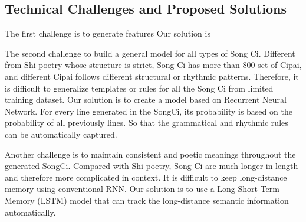 \subsection{Technical Challenges and Proposed Solutions} 
The first challenge is to generate features 
%
Our solution is 

The second challenge to build a general model for all types of Song Ci.
%
Different from Shi poetry whose structure is strict,  Song Ci has more than 800 set of Cipai, and different Cipai follows different structural or rhythmic patterns.
%
Therefore, it is difficult to generalize templates or rules for all the Song Ci from limited training dataset.
% 
Our solution is to create a model based on Recurrent Neural Network. For every line generated in the SongCi, its probability is based on the probability of all previously lines.
%
So that the grammatical and rhythmic rules can be automatically captured.

Another challenge is to maintain consistent and poetic meanings throughout the generated SongCi.
%
Compared with Shi poetry, Song Ci are much longer in length and therefore more complicated in context.
%
It is difficult to keep long-distance memory using conventional RNN.
% 
Our solution is to use a Long Short Term Memory (LSTM) model that can track the long-distance semantic information automatically. 